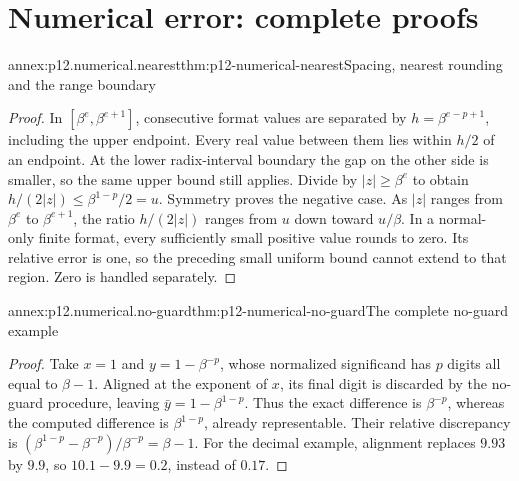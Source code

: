 \section{Numerical error: complete proofs}
\label{sec:annex-p12-numerical-error}

\begin{annexitem}{annex:p12.numerical.nearest}{thm:p12-numerical-nearest}{Spacing, nearest rounding and the range boundary}
\begin{proof}
In \([\beta^e,\beta^{e+1}]\), consecutive format values are separated by
\(h=\beta^{e-p+1}\), including the upper endpoint. Every real value
between them lies within \(h/2\) of an endpoint. At the lower radix-interval
boundary the gap on the other side is smaller, so the same upper bound
still applies. Divide by \(|z|\geq\beta^e\) to obtain
\(h/(2|z|)\leq\beta^{1-p}/2=u\). Symmetry proves the negative case.
As \(|z|\) ranges from \(\beta^e\) to \(\beta^{e+1}\), the ratio
\(h/(2|z|)\) ranges from \(u\) down toward \(u/\beta\).
In a normal-only finite format, every sufficiently small positive value
rounds to zero. Its relative error is one, so the preceding small uniform
bound cannot extend to that region. Zero is handled separately.
\end{proof}
\end{annexitem}

\begin{annexitem}{annex:p12.numerical.no-guard}{thm:p12-numerical-no-guard}{The complete no-guard example}
\begin{proof}
Take \(x=1\) and \(y=1-\beta^{-p}\), whose normalized significand
has \(p\) digits all equal to \(\beta-1\). Aligned at the exponent of
\(x\), its final digit is discarded by the no-guard procedure, leaving
\(\bar y=1-\beta^{1-p}\). Thus the exact difference is
\(\beta^{-p}\), whereas the computed difference is
\(\beta^{1-p}\), already representable. Their relative discrepancy is
\((\beta^{1-p}-\beta^{-p})/\beta^{-p}=\beta-1\).
For the decimal example, alignment replaces \(9.93\) by \(9.9\),
so \(10.1-9.9=0.2\), instead of \(0.17\).
\end{proof}
\end{annexitem}

